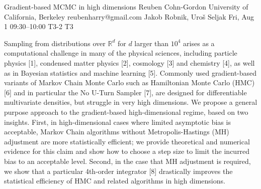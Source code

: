 \documentclass[12pt,lettersize,oneside]{book} %
\begin{document}
\begin{talk}
  {Gradient-based MCMC in high dimensions}%
  {Reuben Cohn-Gordon}%
  {University of California, Berkeley}%
  {reubenharry@gmail.com}%
  {Jakob Robnik, Uro\v{s} Seljak}%
  {}%
  {Fri, Aug 1 09:30--10:00}%
  {T3-2}%
  {T3}%
  
    
   
Sampling from distributions over $\mathbb{R}^d$ for $d$ larger than $10^4$ arises as a computational challenge in many of the physical sciences, including particle physics [1], condensed matter physics [2], cosmology [3] and chemistry [4], as well as in Bayesian statistics and machine learning [5]. Commonly used gradient-based variants of Markov Chain Monte Carlo such as Hamiltonian Monte Carlo (HMC) [6] and in particular the No U-Turn Sampler [7], are designed for differentiable multivariate densities, but struggle in very high dimensions. 
We propose a general purpose approach to the gradient-based high-dimensional regime, based on two insights. First, in high-dimensional cases where limited asymptotic bias is acceptable, Markov Chain algorithms without Metropolis-Hastings (MH) adjustment are more statistically efficient; we provide theoretical and numerical evidence for this claim and show how to choose a step size to limit the incurred bias to an acceptable level. Second, in the case that MH adjustment is required, we show that a particular 4th-order integrator [8] drastically improves the statistical efficiency of HMC and related algorithms in high dimensions.


\medskip


\end{talk}
\end{document}
